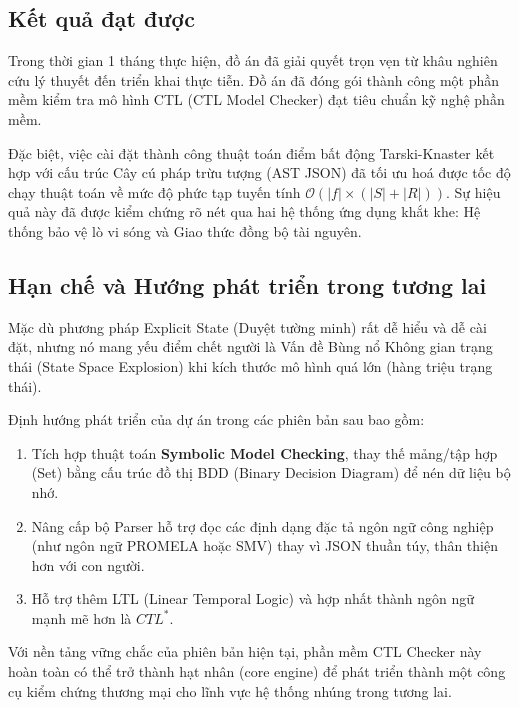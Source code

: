 \documentclass[12pt,a4paper]{article}
\begin{document}
\subsection{Kết quả đạt được}
Trong thời gian 1 tháng thực hiện, đồ án đã giải quyết trọn vẹn từ khâu nghiên cứu lý thuyết đến triển khai thực tiễn. Đồ án đã đóng gói thành công một phần mềm kiểm tra mô hình CTL (CTL Model Checker) đạt tiêu chuẩn kỹ nghệ phần mềm.

Đặc biệt, việc cài đặt thành công thuật toán điểm bất động Tarski-Knaster kết hợp với cấu trúc Cây cú pháp trừu tượng (AST JSON) đã tối ưu hoá được tốc độ chạy thuật toán về mức độ phức tạp tuyến tính $\mathcal{O}(|f| \times (|S| + |R|))$. Sự hiệu quả này đã được kiểm chứng rõ nét qua hai hệ thống ứng dụng khắt khe: Hệ thống bảo vệ lò vi sóng và Giao thức đồng bộ tài nguyên.

\subsection{Hạn chế và Hướng phát triển trong tương lai}
Mặc dù phương pháp Explicit State (Duyệt tường minh) rất dễ hiểu và dễ cài đặt, nhưng nó mang yếu điểm chết người là Vấn đề Bùng nổ Không gian trạng thái (State Space Explosion) khi kích thước mô hình quá lớn (hàng triệu trạng thái). 

Định hướng phát triển của dự án trong các phiên bản sau bao gồm:
\begin{enumerate}
    \item Tích hợp thuật toán \textbf{Symbolic Model Checking}, thay thế mảng/tập hợp (Set) bằng cấu trúc đồ thị BDD (Binary Decision Diagram) để nén dữ liệu bộ nhớ.
    \item Nâng cấp bộ Parser hỗ trợ đọc các định dạng đặc tả ngôn ngữ công nghiệp (như ngôn ngữ PROMELA hoặc SMV) thay vì JSON thuần túy, thân thiện hơn với con người.
    \item Hỗ trợ thêm LTL (Linear Temporal Logic) và hợp nhất thành ngôn ngữ mạnh mẽ hơn là $CTL^*$.
\end{enumerate}

Với nền tảng vững chắc của phiên bản hiện tại, phần mềm CTL Checker này hoàn toàn có thể trở thành hạt nhân (core engine) để phát triển thành một công cụ kiểm chứng thương mại cho lĩnh vực hệ thống nhúng trong tương lai.
\end{document}
